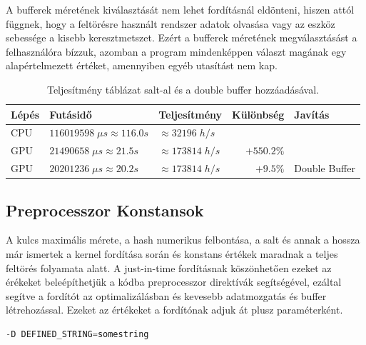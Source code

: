 A bufferek méretének kiválasztását nem lehet fordításnál eldönteni, hiszen attól függnek, hogy a feltörésre használt rendszer adatok olvasása vagy az eszköz sebessége a kisebb keresztmetszet. Ezért a bufferek méretének megválasztásást a felhasználóra bízzuk, azomban a program mindenképpen választ magának egy alapértelmezett értéket, amennyiben egyéb utasítást nem kap. 

\begin{table}[H]
    \centering
    \begin{tabular}{l|l|l|r|l}
        \textbf{Lépés} & \textbf{Futásidő} & \textbf{Teljesítmény} & \textbf{Különbség} & \textbf{Javítás} \\
        \hline
        \hline
        
        CPU & $\num{116 019 598} \; \mu s \approx \num{116.0}s $ & $\approx \num{32 196} \; h/s$ & & \\
        \hline
                            
        GPU & $\num{21 490 658} \; \mu s \approx \num{21.5}s $ & $\approx \num{173 814} \; h/s$ & $+550.2\%$ & \\
        \hline
        
        GPU & $\num{20 201 236} \; \mu s \approx \num{20.2}s $ & $\approx \num{173 814} \; h/s$ & $+9.5\%$ & Double Buffer \\
        \hline
    \end{tabular}
    \caption{Teljesítmény táblázat salt-al és a double buffer hozzáadásával.}
\end{table}





\subsection{Preprocesszor Konstansok}

A kulcs maximális mérete, a hash numerikus felbontása, a salt és annak a hossza már ismertek a kernel fordítása során és konstans értékek maradnak a teljes feltörés folyamata alatt. A just-in-time fordításnak köszönhetően ezeket az érékeket beleépíthetjük a kódba preprocesszor direktívák segítségével, ezáltal segítve a fordítót az optimalizálásban és kevesebb adatmozgatás és buffer létrehozással. Ezeket az értékeket a fordítónak adjuk át plusz paraméterként.

\begin{lstlisting}[language={C++}]
-D DEFINED_STRING=somestring
\end{lstlisting}

